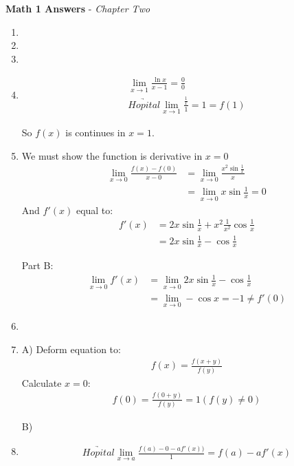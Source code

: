 \documentclass{article}
\begin{document}
	{\Large \textbf{Math 1 Answers} - \textit{Chapter Two}}
	
	\begin{enumerate}
		\item 
		
		\item 
		
		\item 
		
		\item 
		\begin{align*}
			\lim_{x \rightarrow 1} \frac{\ln x}{x - 1} = \frac{0}{0} \\
			\underrightarrow{Hopital} \lim_{x \rightarrow 1} \frac{\frac{1}{x}}{1} = 1 = f(1)		
		\end{align*}
	
		So $f(x)$ is continues in $x = 1$.
		
		\item We must show the function is derivative in $x = 0$
		\begin{align*}
			\lim_{x \rightarrow 0} \frac{f(x) - f(0)}{x - 0} &= \lim_{x \rightarrow 0} \frac{x^2\sin\frac{1}{x}}{x} \\
			&= \lim_{x \rightarrow 0} x\sin\frac{1}{x} = 0
		\end{align*}
		And $f'(x)$ equal to:
		\begin{align*}
			f'(x) &= 2x\sin\frac{1}{x} + x^2\frac{1}{x^2}\cos\frac{1}{x} \\
			&= 2x\sin\frac{1}{x} - \cos\frac{1}{x} 
		\end{align*}
	
		Part B:
		\begin{align*}
			\lim_{x \rightarrow 0} f'(x) &= \lim_{x \rightarrow 0} 2x\sin\frac{1}{x} - \cos\frac{1}{x} \\
			&= \lim_{x \rightarrow 0} -\cos x = -1 \neq f'(0)
		\end{align*}
	
		\item 
		
		\item A) Deform equation to:
		\begin{align*}
			f(x) = \frac{f(x + y)}{f(y)}
		\end{align*}
		Calculate $x = 0$:
		\begin{align*}
			f(0) = \frac{f(0 + y)}{f(y)} = 1 (f(y) \neq 0)
		\end{align*}
	
		B)
		
		\item
		\begin{align*}
			\underrightarrow{Hopital} \lim_{x \rightarrow a} \frac{f(a) - 0 - af'(x))}{1} = f(a) - af'(x)
		\end{align*}
	

\end{enumerate}
\end{document}
